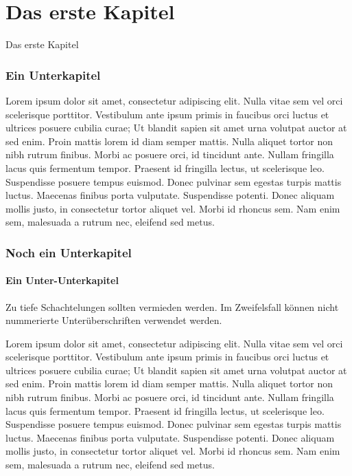 \chapter{Das erste Kapitel}

Das erste Kapitel

\subsection{Ein Unterkapitel}

Lorem ipsum dolor sit amet, consectetur adipiscing elit. Nulla vitae sem vel orci scelerisque porttitor. Vestibulum ante ipsum primis in faucibus orci luctus et ultrices posuere cubilia curae; Ut blandit sapien sit amet urna volutpat auctor at sed enim. Proin mattis lorem id diam semper mattis. Nulla aliquet tortor non nibh rutrum finibus. Morbi ac posuere orci, id tincidunt ante. Nullam fringilla lacus quis fermentum tempor. Praesent id fringilla lectus, ut scelerisque leo. Suspendisse posuere tempus euismod. Donec pulvinar sem egestas turpis mattis luctus. Maecenas finibus porta vulputate. Suspendisse potenti. Donec aliquam mollis justo, in consectetur tortor aliquet vel. Morbi id rhoncus sem. Nam enim sem, malesuada a rutrum nec, eleifend sed metus.



\subsection{Noch ein  Unterkapitel}

\subsubsection{Ein Unter-Unterkapitel}

Zu tiefe Schachtelungen sollten vermieden werden. Im Zweifelsfall k\"onnen nicht nummerierte Unter\"uberschriften verwendet werden.


Lorem ipsum dolor sit amet, consectetur adipiscing elit. Nulla vitae sem vel orci scelerisque porttitor. Vestibulum ante ipsum primis in faucibus orci luctus et ultrices posuere cubilia curae; Ut blandit sapien sit amet urna volutpat auctor at sed enim. Proin mattis lorem id diam semper mattis. Nulla aliquet tortor non nibh rutrum finibus. Morbi ac posuere orci, id tincidunt ante. Nullam fringilla lacus quis fermentum tempor. Praesent id fringilla lectus, ut scelerisque leo. Suspendisse posuere tempus euismod. Donec pulvinar sem egestas turpis mattis luctus. Maecenas finibus porta vulputate. Suspendisse potenti. Donec aliquam mollis justo, in consectetur tortor aliquet vel. Morbi id rhoncus sem. Nam enim sem, malesuada a rutrum nec, eleifend sed metus.



